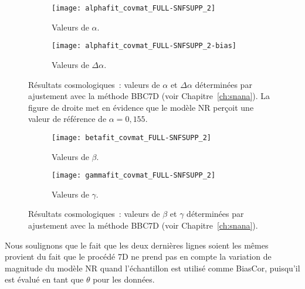 \documentclass[../main/main.tex]{subfiles}
\begin{document}
\begin{figure}[ht]
    \centering
    \begin{subfigure}[]{.48\linewidth}
        \centering
        \texttt{[image: alphafit\_covmat\_FULL-SNFSUPP\_2]}
        \caption[Valeurs de $\alpha$ avec le modèle de masse SNfsupp]{Valeurs de
        $\alpha$.}
        \label{fig:cosmoa}
    \end{subfigure}
    \hfill
    \begin{subfigure}[]{.48\linewidth}
        \centering
        \texttt{[image: alphafit\_covmat\_FULL-SNFSUPP\_2-bias]}
        \caption[Valeurs de $\Delta\alpha$ avec le modèle de masse
        SNfsupp]{Valeurs de $\Delta\alpha$.}
        \label{fig:cosmoda}
    \end{subfigure}
    \caption[Résultats cosmologiques~: $\alpha$ et $\Delta\alpha$]{Résultats
        cosmologiques~: valeurs de $\alpha$ et $\Delta\alpha$ déterminées par
        ajustement avec la méthode BBC7D (voir
        Chapitre~\ref{ch:snana}). La figure de droite met en
        évidence que le modèle NR perçoit une valeur de référence de $\alpha =
    0,155$.}
    \label{fig:cosmo1}
\end{figure}

\begin{figure}[h!]
    \centering
    \begin{subfigure}[]{.48\linewidth}
        \centering
        \texttt{[image: betafit\_covmat\_FULL-SNFSUPP\_2]}
        \caption[Valeurs de $\beta$ avec le modèle de masse SNfsupp]{Valeurs de
        $\beta$.}
        \label{fig:cosmob}
    \end{subfigure}
    \hfill
    \begin{subfigure}[]{.48\linewidth}
        \centering
        \texttt{[image: gammafit\_covmat\_FULL-SNFSUPP\_2]}
        \caption[Valeurs de $\gamma$ avec le modèle de masse SNfsupp]{Valeurs de
        $\gamma$.}
        \label{fig:cosmog}
    \end{subfigure}
    \caption[Résultats cosmologiques~: $\beta$ et $\gamma$]{Résultats
        cosmologiques~: valeurs de $\beta$ et $\gamma$ déterminées par ajustement
        avec la méthode BBC7D (voir
    Chapitre~\ref{ch:snana}).}
    \label{fig:cosmo2}
\end{figure}

Nous soulignons que le fait que les deux dernières lignes soient les mêmes
provient du fait que le procédé \bbc7D ne prend pas en compte la variation de
magnitude du modèle NR quand l'échantillon est utilisé comme BiasCor, puisqu'il
est évalué en tant que $\theta$ pour les données.
\end{document}
